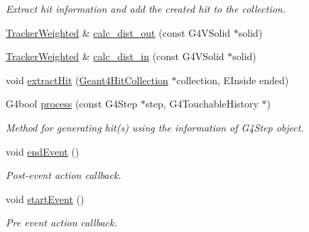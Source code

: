\begin{DoxyCompactItemize}
\begin{DoxyCompactList}\small\item\em Extract hit information and add the created hit to the collection. \item\end{DoxyCompactList}\item 
\hyperlink{struct_d_d4hep_1_1_simulation_1_1_tracker_weighted}{TrackerWeighted} \& \hyperlink{struct_d_d4hep_1_1_simulation_1_1_tracker_weighted_ac7628c08fbf29a1dc2133ac7b30e1499}{calc\_\-dist\_\-out} (const G4VSolid $\ast$solid)
\item 
\hyperlink{struct_d_d4hep_1_1_simulation_1_1_tracker_weighted}{TrackerWeighted} \& \hyperlink{struct_d_d4hep_1_1_simulation_1_1_tracker_weighted_aa9139da9ecb7c109b7108cc27a27c13d}{calc\_\-dist\_\-in} (const G4VSolid $\ast$solid)
\item 
void \hyperlink{struct_d_d4hep_1_1_simulation_1_1_tracker_weighted_a690b6f7fdcda6bbec2e7cb89f4fce9af}{extractHit} (\hyperlink{class_d_d4hep_1_1_simulation_1_1_geant4_hit_collection}{Geant4HitCollection} $\ast$collection, EInside ended)
\item 
G4bool \hyperlink{struct_d_d4hep_1_1_simulation_1_1_tracker_weighted_ab258cb542897a7bd369fd204eafbb245}{process} (const G4Step $\ast$step, G4TouchableHistory $\ast$)
\begin{DoxyCompactList}\small\item\em Method for generating hit(s) using the information of G4Step object. \item\end{DoxyCompactList}\item 
void \hyperlink{struct_d_d4hep_1_1_simulation_1_1_tracker_weighted_aa489deb875d6f5867917d2b7aae00747}{endEvent} ()
\begin{DoxyCompactList}\small\item\em Post-\/event action callback. \item\end{DoxyCompactList}\item 
void \hyperlink{struct_d_d4hep_1_1_simulation_1_1_tracker_weighted_a15fd630fa0e1ca7e3c0516952ad5f976}{startEvent} ()
\begin{DoxyCompactList}\small\item\em Pre event action callback. \item\end{DoxyCompactList}\end{DoxyCompactItemize}
